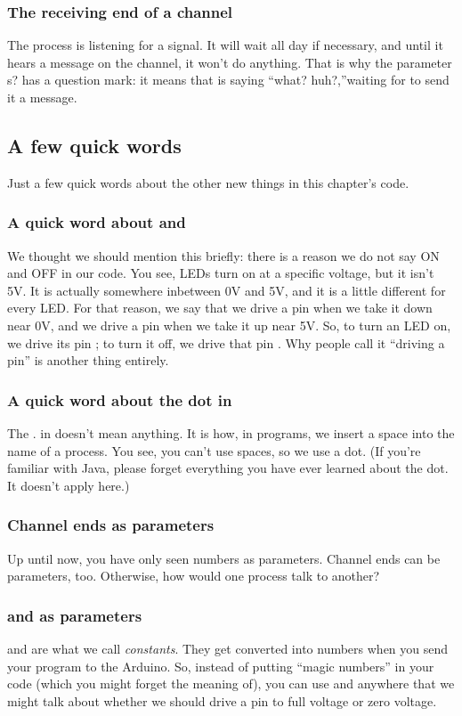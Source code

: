 \subsubsection{The receiving end of a channel}
The \tp process is listening for a signal. It will wait all day if necessary, and until it hears a message on the channel, it won't do anything. That is why the parameter {\code s?} has a question mark: it means that \tp is saying ``what? huh?,''waiting for \bp to send it a message.

\subsection{A few quick words}
Just a few quick words about the other new things in this chapter's code.

\subsubsection{A quick word about \LOW and \HIGH}
We thought we should mention this briefly: there is a reason we do not say {\code ON} and {\code OFF} in our code. You see, LEDs turn on at a specific voltage, but it isn't 5V. It is actually somewhere inbetween 0V and 5V, and it is a little different for every LED. For that reason, we say that we drive a pin \LOW when we take it down near 0V, and we drive a pin \HIGH when we take it up near 5V. So, to turn an LED on, we drive its pin \HIGH; to turn it off, we drive that pin \LOW. Why people call it ``driving a pin'' is another thing entirely.

\subsubsection{A quick word about the dot in \bp}
The {\code .} in \bp doesn't mean anything. It is how, in \plumbing programs, we insert a space into the name of a process. You see, you can't use spaces, so we use a dot. (If you're familiar with Java, please forget everything you have ever learned about the dot. It doesn't apply here.)

\subsubsection{Channel ends as parameters}
Up until now, you have only seen numbers as parameters. Channel ends can be parameters, too. Otherwise, how would one process talk to another?

\subsubsection{\LOW and \HIGH as parameters}
\LOW and \HIGH are what we call {\em constants}. They get converted into numbers when you send your program to the Arduino. So, instead of putting ``magic numbers'' in your code (which you might forget the meaning of), you can use \LOW and \HIGH anywhere that we might talk about whether we should drive a pin to full voltage or zero voltage.

